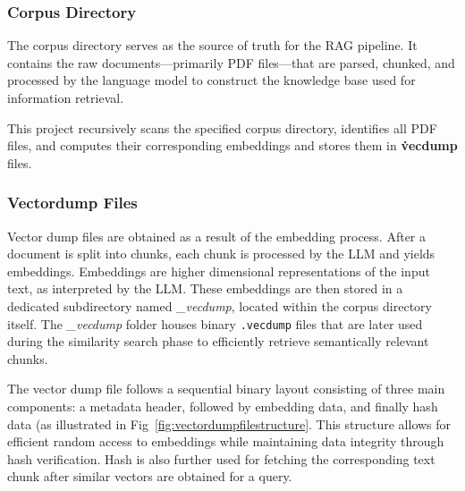 \subsubsection{Corpus Directory}
\label{subsec:AppDesignModules-CorpusDir}
The corpus directory serves as the source of truth for the RAG pipeline. It contains the raw documents—primarily PDF files—that are parsed, chunked, and processed by the language model to construct the knowledge base used for information retrieval. 

This project recursively scans the specified corpus directory, identifies all PDF files, and computes their corresponding embeddings and stores them in \textbf{\.vecdump} files.
\subsubsection{Vectordump Files}
\label{subsec:AppDesignModules-Vectordump_FileStructure}
Vector dump files are obtained as a result of the embedding process. After a document is split into chunks, each chunk is processed by the LLM and yields embeddings. Embeddings are higher dimensional representations of the input text, as interpreted by the LLM. 
These embeddings are then stored in a dedicated subdirectory named \textit{\_vecdump}, located within the corpus directory itself. The \textit{\_vecdump} folder houses binary \texttt{.vecdump} files that are later used during the similarity search phase to efficiently retrieve semantically relevant chunks.

The vector dump file follows a sequential binary layout consisting of three main components: a metadata header, followed by embedding data, and finally hash data (as illustrated in Fig~\ref{fig:vectordumpfilestructure}. This structure allows for efficient random access to embeddings while maintaining data integrity through hash verification. Hash is also further used for fetching the corresponding text chunk after similar vectors are obtained for a query.

